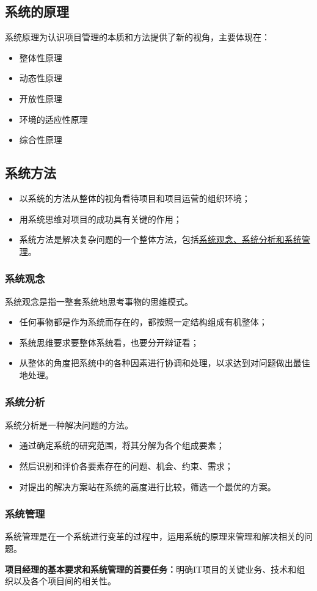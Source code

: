 \subsection{系统的原理}
系统原理为认识项目管理的本质和方法提供了新的视角，主要体现在：
\begin{itemize}
	\item 整体性原理
	\item 动态性原理
	\item 开放性原理
	\item 环境的适应性原理
	\item 综合性原理
\end{itemize}
\subsection{系统方法}
\begin{itemize}
	\item 以系统的方法从整体的视角看待项目和项目运营的组织环境；
	\item 用系统思维对项目的成功具有关键的作用；
	\item 系统方法是解决复杂问题的一个整体方法，包括\underline{系统观念、系统分析和系统管理}。
\end{itemize}
\subsubsection*{系统观念}
系统观念是指一整套系统地思考事物的思维模式。
\begin{itemize}
	\item 任何事物都是作为系统而存在的，都按照一定结构组成有机整体；
	\item 系统思维要求要整体系统看，也要分开辩证看；
	\item 从整体的角度把系统中的各种因素进行协调和处理，以求达到对问题做出最佳地处理。
\end{itemize}
\subsubsection*{系统分析}
系统分析是一种解决问题的方法。
\begin{itemize}
	\item 通过确定系统的研究范围，将其分解为各个组成要素；
	\item 然后识别和评价各要素存在的问题、机会、约束、需求；
	\item 对提出的解决方案站在系统的高度进行比较，筛选一个最优的方案。
\end{itemize}
\subsubsection*{系统管理}
系统管理是在一个系统进行变革的过程中，运用系统的原理来管理和解决相关的问题。
\par \textbf{项目经理的基本要求和系统管理的首要任务：}明确IT项目的关键业务、技术和组织以及各个项目间的相关性。

